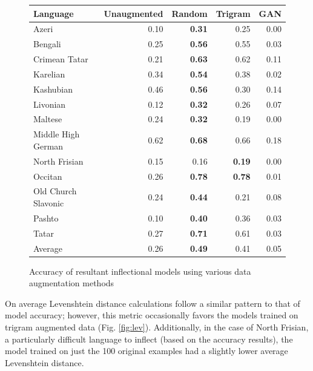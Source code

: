 \documentclass{article}
\begin{document}
      \begin{figure}[H]
        \center
        \begin{tabular}{lrrrr}
          \toprule
          Language & Unaugmented & Random & Trigram & GAN \\
          \midrule
          Azeri & 0.10 & \textbf{0.31} & 0.25 & 0.00 \\
          Bengali & 0.25 & \textbf{0.56} & 0.55 & 0.03 \\
          Crimean Tatar & 0.21 & \textbf{0.63} & 0.62 & 0.11 \\
          Karelian & 0.34 & \textbf{0.54} & 0.38 & 0.02 \\
          Kashubian & 0.46 & \textbf{0.56} & 0.30 & 0.14 \\
          Livonian & 0.12 & \textbf{0.32} & 0.26 & 0.07 \\
          Maltese & 0.24 & \textbf{0.32} & 0.19 & 0.00 \\
          Middle High German & 0.62 & \textbf{0.68} & 0.66 & 0.18 \\
          North Frisian & 0.15 & 0.16 & \textbf{0.19} & 0.00 \\
          Occitan & 0.26 & \textbf{0.78} & \textbf{0.78} & 0.01 \\
          Old Church Slavonic & 0.24 & \textbf{0.44} & 0.21 & 0.08 \\
          Pashto & 0.10 & \textbf{0.40} & 0.36 & 0.03\\
          Tatar & 0.27 & \textbf{0.71} & 0.61 & 0.03\\
          \midrule
          Average & 0.26 & \textbf{0.49} & 0.41 & 0.05\\
          \bottomrule
        \end{tabular}
        \caption{Accuracy of resultant inflectional models using various data augmentation methods}
        \label{fig:accuracy}
      \end{figure}

      On average Levenshtein distance calculations follow a similar pattern to that of model accuracy; however, this metric occasionally favors the models trained on trigram augmented data (Fig. \ref{fig:lev}). Additionally, in the case of North Frisian, a particularly difficult language to inflect (based on the accuracy results), the model trained on just the 100 original examples had a slightly lower average Levenshtein distance.
    
\end{document}
